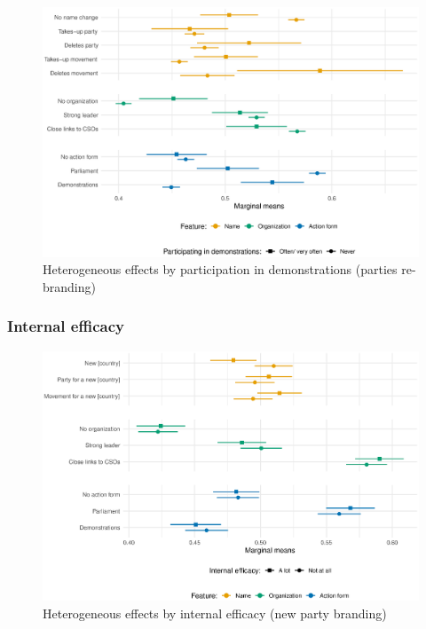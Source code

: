 \documentclass[12pt]{article}
\begin{document}
\begin{figure}[H]
\includegraphics[width=\textwidth]{./Figures/CJ2_heteff_act_demo_tradeoff.eps}
\caption{Heterogeneous effects by participation in demonstrations (parties re-branding)}
\end{figure}

\subsubsection{Internal efficacy}

\begin{figure}[H]
\includegraphics[width=\textwidth]{./Figures/CJ1_heteff_int_eff_tradeoff.eps}
\caption{Heterogeneous effects by internal efficacy (new party branding)}
\end{figure}
\end{document}
